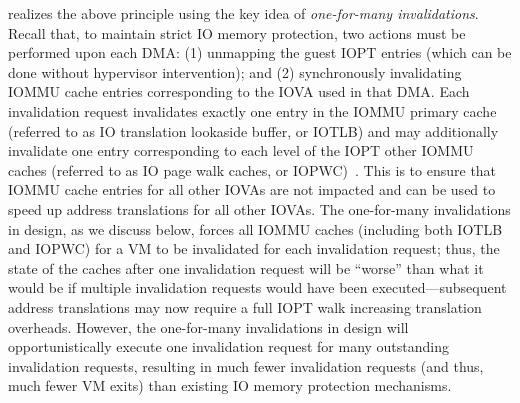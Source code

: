 {\vfreename} realizes the above principle using the key idea of \textit{one-for-many invalidations}. 
Recall that, to maintain strict IO memory protection, two actions must be performed upon each DMA: 
(1) unmapping the guest IOPT entries (which can be done without hypervisor intervention); 
and (2) synchronously invalidating IOMMU cache entries corresponding to the IOVA used in that DMA. 
Each invalidation request invalidates exactly one entry in the IOMMU primary cache 
    (referred to as IO translation lookaside buffer, or IOTLB) 
    and may additionally invalidate one entry corresponding to each level of the IOPT other IOMMU caches 
    (referred to as IO page walk caches, or IOPWC)~\cite{Rubin2024FastSafe}. 
This is to ensure that IOMMU cache entries for all other IOVAs are not impacted 
    and can be used to speed up address translations for all other IOVAs. 
The one-for-many invalidations in {\vfreename} design, as we discuss below, 
    forces all IOMMU caches (including both IOTLB and IOPWC) 
    for a VM to be invalidated for each invalidation request; 
    thus, the state of the caches after one invalidation request will be ``worse'' 
    than what it would be if multiple invalidation requests would have been executed---subsequent 
    address translations may now require a full IOPT walk increasing translation overheads. 
    However, the one-for-many invalidations in {\vfreename} design will opportunistically execute one 
    invalidation request for many outstanding invalidation requests, 
    resulting in much fewer invalidation requests (and thus, much fewer VM exits) than existing IO memory protection mechanisms.

